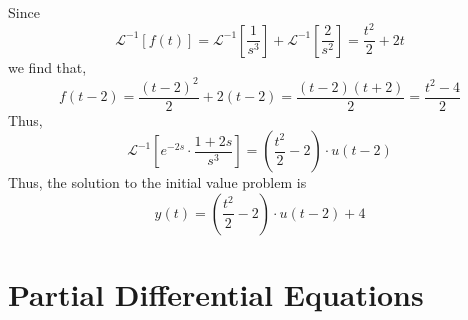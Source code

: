 \documentclass{article}
\begin{document}
\begin{enumerate}
\begin{equation*}
    \end{equation*}
    Since
    \begin{equation*}
        \mathcal{L}^{-1}[f(t)]=\mathcal{L}^{-1}[\frac{1}{s^3}]+\mathcal{L}^{-1}[\frac{2}{s^2}]=\frac{t^2}{2}+2t
    \end{equation*}
    we find that,
    \begin{equation*}
        f(t-2)=\frac{(t-2)^2}{2}+2(t-2)=\frac{(t-2)(t+2)}{2}=\frac{t^2-4}{2}
    \end{equation*}
    Thus,
    \begin{equation*}
        \mathcal{L}^{-1}[e^{-2s}\cdot \frac{1+2s}{s^3}]=(\frac{t^2}{2}-2)\cdot u(t-2)
    \end{equation*}
    Thus, the solution to the initial value problem is
    \begin{equation*}
        y(t)=(\frac{t^2}{2}-2)\cdot u(t-2)+4
    \end{equation*}
\end{enumerate}
\newpage
\section{Partial Differential Equations}
\end{document}

